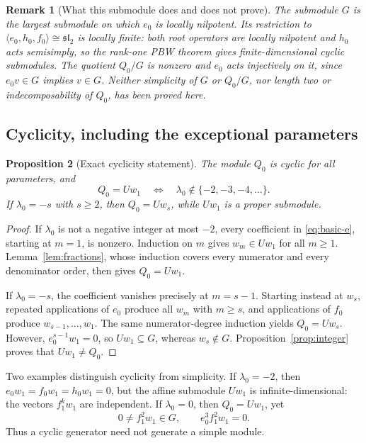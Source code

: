 \documentclass[11pt,a4paper]{article}
\newcommand{\slc}{\mathfrak{sl}_2}
\theoremstyle{plainupright}
\newtheorem{proposition}{Proposition}[section]
\newtheorem{remark}[proposition]{Remark}
\begin{document}
\begin{remark}[What this submodule does and does not prove]\label{rem:G}
The submodule \(G\) is the largest submodule on which \(e_0\) is locally
nilpotent. Its restriction to
\(\langle e_0,h_0,f_0\rangle\cong\slc\) is locally finite:
both root operators are locally nilpotent and \(h_0\) acts semisimply,
so the rank-one PBW theorem gives finite-dimensional cyclic submodules.
The quotient \(Q_0/G\) is nonzero and \(e_0\) acts injectively on it,
since \(e_0v\in G\) implies \(v\in G\).
Neither simplicity of \(G\) or \(Q_0/G\), nor length two or
indecomposability of \(Q_0\), has been proved here.
\end{remark}

\subsection{Cyclicity, including the exceptional parameters}

\begin{proposition}[Exact cyclicity statement]\label{prop:cyclic}
The module \(Q_0\) is cyclic for all parameters, and
\[
Q_0=Uw_1\quad\Longleftrightarrow\quad
\lambda_0\notin\{-2,-3,-4,\ldots\}.
\]
If \(\lambda_0=-s\) with \(s\ge2\), then \(Q_0=Uw_s\), while \(Uw_1\)
is a proper submodule.
\end{proposition}
\begin{proof}
If \(\lambda_0\) is not a negative integer at most \(-2\), every
coefficient in \eqref{eq:basic-e}, starting at \(m=1\), is nonzero.
Induction on \(m\) gives \(w_m\in Uw_1\) for all \(m\ge1\).
Lemma~\ref{lem:fractions}, whose induction covers every numerator and
every denominator order, then gives \(Q_0=Uw_1\).

If \(\lambda_0=-s\), the coefficient vanishes precisely at \(m=s-1\).
Starting instead at \(w_s\), repeated applications of \(e_0\) produce
all \(w_m\) with \(m\ge s\), and applications of \(f_0\) produce
\(w_{s-1},\ldots,w_1\). The same numerator-degree induction yields
\(Q_0=Uw_s\). However, \(e_0^{s-1}w_1=0\), so
\(Uw_1\subseteq G\), whereas \(w_s\notin G\).
Proposition~\ref{prop:integer} proves that \(Uw_1\ne Q_0\).
\end{proof}

Two examples distinguish cyclicity from simplicity.
If \(\lambda_0=-2\), then \(e_0w_1=f_0w_1=h_0w_1=0\), but the affine
submodule \(Uw_1\) is infinite-dimensional: the vectors \(f_1^kw_1\)
are independent. If \(\lambda_0=0\), then \(Q_0=Uw_1\), yet
\[
0\ne f_1^2w_1\in G,\qquad e_0^3f_1^2w_1=0.
\]
Thus a cyclic generator need not generate a simple module.
\end{document}
